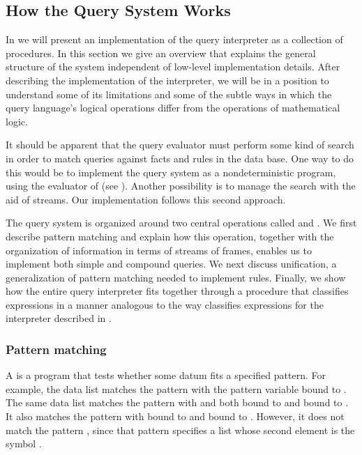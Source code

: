 \subsection{How the Query System Works}
\label{Section 4.4.2}

In  we will present an implementation of the query
interpreter as a collection of procedures.  In this section we give an overview
that explains the general structure of the system independent of low-level
implementation details.  After describing the implementation of the
interpreter, we will be in a position to understand some of its limitations and
some of the subtle ways in which the query language's logical operations differ
from the operations of mathematical logic.

It should be apparent that the query evaluator must perform some kind of search
in order to match queries against facts and rules in the data base.  One way to
do this would be to implement the query system as a nondeterministic program,
using the  evaluator of  (see ).
Another possibility is to manage the search with the aid of streams.  Our
implementation follows this second approach.

The query system is organized around two central operations called
 and .  We first describe
pattern matching and explain how this operation, together with the organization
of information in terms of streams of frames, enables us to implement both
simple and compound queries.  We next discuss unification, a generalization of
pattern matching needed to implement rules.  Finally, we show how the entire
query interpreter fits together through a procedure that classifies expressions
in a manner analogous to the way  classifies expressions for the
interpreter described in .

\subsubsection*{Pattern matching}

A  is a program that tests whether some datum fits a
specified pattern.  For example, the data list  matches
the pattern  with the pattern variable  bound to
.  The same data list matches the pattern  with
 and  both bound to  and  bound to
.  It also matches the pattern  with
 bound to  and  bound to .  However, it does
not match the pattern , since that pattern specifies a list
whose second element is the symbol .

